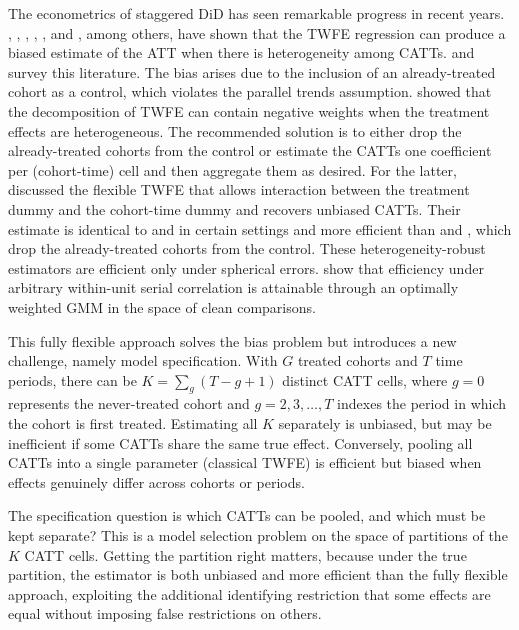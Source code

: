 \documentclass[margin=5in, 12pt]{article}
\newcommand{\1}{\mathbbm{1}}
\begin{document}
The econometrics of staggered DiD has seen remarkable progress in recent years. \citet{dechaisemartin2020}, \citet{callaway2021}, \citet{sun2021}, \citet{goodman2021}, \citet{gardner2022two}, and
\citet{borusyak2024}, among others, have shown that the TWFE regression can produce a biased estimate of the ATT when there is heterogeneity among CATTs. \citet{dechaisemartin2023} and \citet{roth2023} survey this literature. The bias arises due to the inclusion of an already-treated cohort as a control, which violates the parallel trends assumption. \citet{goodman2021} showed that the decomposition of TWFE can contain negative weights when the treatment effects are heterogeneous. The recommended solution is to either drop the already-treated cohorts from the control or estimate the CATTs one coefficient per (cohort-time) cell and then aggregate them as desired. For the latter, \citet{wooldridge2025} discussed the flexible TWFE that allows interaction between the treatment dummy and the cohort-time dummy and recovers unbiased CATTs. Their estimate is identical to \citet{gardner2022two} and \citet{borusyak2024} in certain settings and more efficient than \citet{callaway2021} and \citet{sun2021}, which drop the already-treated cohorts from the control. These heterogeneity-robust estimators are efficient only under spherical errors. \citet{arora2026} show that efficiency under arbitrary within-unit serial correlation is attainable through an optimally weighted GMM in the space of clean comparisons.

This fully flexible approach solves the bias problem but introduces a new challenge, namely model specification. With $G$ treated cohorts and $T$ time
periods, there can be $K = \sum_g (T - g + 1)$ distinct CATT cells, where $g = 0$ represents the never-treated cohort and $g=2,3,\dotsc,T$ indexes the period in which the cohort is first treated. Estimating all $K$ separately is unbiased, but may be inefficient if some CATTs share the same true effect.
Conversely, pooling all CATTs into a single parameter (classical TWFE) is
efficient but biased when effects genuinely differ across cohorts or periods.

The specification question is which CATTs can be pooled, and which
must be kept separate? This is a model selection problem on the space of
partitions of the $K$ CATT cells. Getting the partition right matters, because under
the true partition, the estimator is both unbiased and more efficient than the
fully flexible approach, exploiting the additional identifying restriction that
some effects are equal without imposing false restrictions on others.
\end{document}
